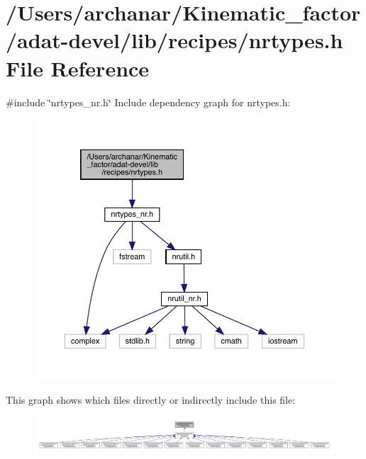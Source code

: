 \hypertarget{adat-devel_2lib_2recipes_2nrtypes_8h}{}\section{/\+Users/archanar/\+Kinematic\+\_\+factor/adat-\/devel/lib/recipes/nrtypes.h File Reference}
\label{adat-devel_2lib_2recipes_2nrtypes_8h}
{\ttfamily \#include \char`\"{}nrtypes\+\_\+nr.\+h\char`\"{}}\newline
Include dependency graph for nrtypes.\+h\+:
\nopagebreak
\begin{figure}[H]
\begin{center}
\leavevmode
\includegraphics[width=350pt]{d4/df9/adat-devel_2lib_2recipes_2nrtypes_8h__incl}
\end{center}
\end{figure}
This graph shows which files directly or indirectly include this file\+:
\nopagebreak
\begin{figure}[H]
\begin{center}
\leavevmode
\includegraphics[width=350pt]{de/dec/adat-devel_2lib_2recipes_2nrtypes_8h__dep__incl}
\end{center}
\end{figure}
